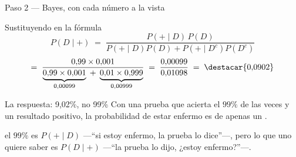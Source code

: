 \documentclass[aspectratio=169,10pt]{beamer}
\begin{document}
\begin{frame}{Paso 2 — Bayes, con cada número a la vista}
  \scriptsize
  \begin{exampleblock}{Sustituyendo en la fórmula}
    \tiny
    \[ P(D\mid +) \;=\;
       \frac{P(+\mid D)\,P(D)}
            {P(+\mid D)P(D)+P(+\mid D^{c})P(D^{c})} \]
    \[ =\;\frac{0{,}99\times 0{,}001}
              {\underbrace{0{,}99\times 0{,}001}_{0{,}00099}
               \;+\;\underbrace{0{,}01\times 0{,}999}_{0{,}00999}}
       \;=\;\frac{0{,}00099}{0{,}01098}
       \;=\;\destacar{0{,}0902} \]
  \end{exampleblock}

  \vspace{0.08cm}
  \begin{alertblock}{La respuesta: 9,02\%, no 99\%}
    \tiny
    Con una prueba que acierta el $99\%$ de las veces y un resultado
    positivo, la probabilidad de estar enfermo es de apenas un
    . 
  \end{alertblock}

  \vspace{0.06cm}
  {\tiny\color{uniGris}  el $99\%$ es
  $P(+\mid D)$ —``si estoy enfermo, la prueba lo dice''—, pero lo que uno
  quiere saber es $P(D\mid +)$ —``la prueba lo dijo, ¿estoy enfermo?''—.
  }
\end{frame}
\end{document}
